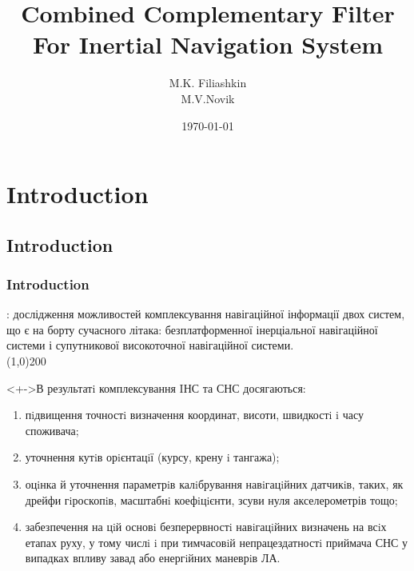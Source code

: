 \documentclass[compress]{beamer}    %
\begin{document}
\title{Combined Complementary Filter For Inertial Navigation System}  
\author{M.K. Filiashkin \\ M.V.Novik}
\date{\today} 
\begin{frame}
\titlepage
\end{frame}

\section{Introduction} 
\subsection{Introduction} 
\begin{frame}\frametitle{Introduction}
\small
{}: дослідження можливостей комплексування навігаційної інформації двох систем, що є на борту сучасного літака: безплатформенної інерціальної навігаційної системи і супутникової високоточної навігаційної системи.\\
\centering \line(1,0){200}

\begin{block}<+->{В результатi комплексування IНС та СНС досягаються:}
\tiny
\begin{enumerate}
\item  пiдвищення точностi визначення координат, висоти, швидкостi i часу споживача;
\item  уточнення кутiв орiєнтацiї (курсу, крену i тангажа);
\item  оцiнка й уточнення параметрiв калiбрування навiгацiйних датчикiв,
таких, як дрейфи гiроскопiв, масштабнi коефiцiєнти, зсуви нуля акселерометрів тощо;
\item  забезпечення на цiй основi безперервностi навiгацiйних визначень на всiх етапах руху, у тому числi i при тимчасовiй непрацездатностi приймача СНС у випадках впливу завад або енергiйних маневрiв ЛА.

\end{enumerate}
\end{block}

\end{frame} 
\end{document}
